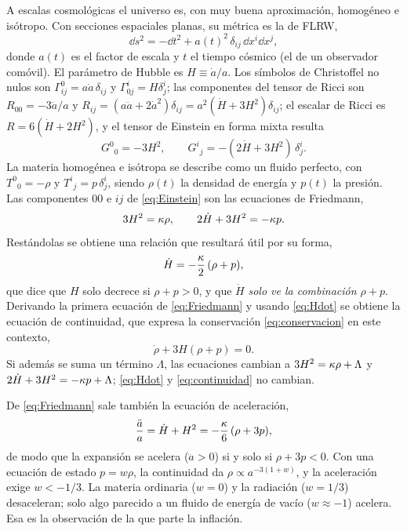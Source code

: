 A escalas cosmológicas el universo es, con muy buena aproximación, homogéneo e isótropo. Con secciones espaciales planas, su métrica es la de FLRW,
\begin{equation}
\dd s^2=-\dd t^2+a(t)^2\,\delta_{ij}\,\dd x^i\dd x^j,
\label{eq:FLRW}
\end{equation}
donde $a(t)$ es el factor de escala y $t$ el tiempo cósmico (el de un observador comóvil). El parámetro de Hubble es $H\equiv\dot a/a$. Los símbolos de Christoffel no nulos son $\Gamma^0_{ij}=a\dot a\,\delta_{ij}$ y $\Gamma^i_{0j}=H\delta^i_j$; las componentes del tensor de Ricci son $R_{00}=-3\ddot a/a$ y $R_{ij}=(a\ddot a+2\dot a^2)\delta_{ij}=a^2(\dot H+3H^2)\delta_{ij}$; el escalar de Ricci es $R=6(\dot H+2H^2)$, y el tensor de Einstein en forma mixta resulta
\begin{equation}
G^0{}_0=-3H^2,\qquad G^i{}_j=-(2\dot H+3H^2)\,\delta^i_j.
\label{eq:Gfondo}
\end{equation}
La materia homogénea e isótropa se describe como un fluido perfecto, con $T^0{}_0=-\rho$ y $T^i{}_j=p\,\delta^i_j$, siendo $\rho(t)$ la densidad de energía y $p(t)$ la presión. Las componentes $00$ e $ij$ de \eqref{eq:Einstein} son las ecuaciones de Friedmann,
\begin{equation}
3H^2=\kappa\rho,\qquad 2\dot H+3H^2=-\kappa p.
\label{eq:Friedmann}
\end{equation}
Restándolas se obtiene una relación que resultará útil por su forma,
\begin{equation}
\dot H=-\frac{\kappa}{2}\,(\rho+p),
\label{eq:Hdot}
\end{equation}
que dice que $H$ solo decrece si $\rho+p>0$, y que $\dot H$ \emph{solo ve la combinación $\rho+p$}. Derivando la primera ecuación de \eqref{eq:Friedmann} y usando \eqref{eq:Hdot} se obtiene la ecuación de continuidad, que expresa la conservación \eqref{eq:conservacion} en este contexto,
\begin{equation}
\dot\rho+3H(\rho+p)=0.
\label{eq:continuidad}
\end{equation}
Si además se suma un término $\Lambda$, las ecuaciones cambian a $3H^2=\kappa\rho+\Lambda$ y $2\dot H+3H^2=-\kappa p+\Lambda$; \eqref{eq:Hdot} y \eqref{eq:continuidad} no cambian.

De \eqref{eq:Friedmann} sale también la ecuación de aceleración,
\begin{equation}
\frac{\ddot a}{a}=\dot H+H^2=-\frac{\kappa}{6}\,(\rho+3p),
\label{eq:aceleracion}
\end{equation}
de modo que la expansión se acelera ($\ddot a>0$) si y solo si $\rho+3p<0$. Con una ecuación de estado $p=w\rho$, la continuidad da $\rho\propto a^{-3(1+w)}$, y la aceleración exige $w<-1/3$. La materia ordinaria ($w=0$) y la radiación ($w=1/3$) desaceleran; solo algo parecido a un fluido de energía de vacío ($w\approx-1$) acelera. Esa es la observación de la que parte la inflación.


